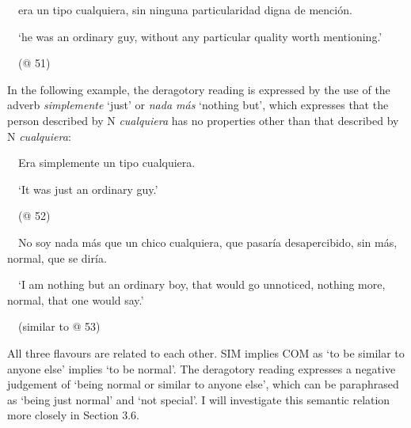 \begin{styleStandard}
\ \ era un tipo cualquiera, sin ninguna particularidad digna de mención.
\end{styleStandard}

\begin{styleStandard}
\ \ ‘he was an ordinary guy, without any particular quality worth mentioning.’
\end{styleStandard}

\begin{styleStandard}
\ \ (@ 51)
\end{styleStandard}

\begin{styleStandard}
In the following example, the deragotory reading is expressed by the use of the adverb \textit{simplemente} ‘just’ or \textit{nada más} ‘nothing but’, which expresses that the person described by N \textit{cualquiera }has no properties other than that described by N \textit{cualquiera}:
\end{styleStandard}

\begin{styleStandard}
\ \ Era simplemente un tipo cualquiera.
\end{styleStandard}

\begin{styleStandard}
\ \ ‘It was just an ordinary guy.’
\end{styleStandard}

\begin{styleStandard}
\ \ (@ 52)
\end{styleStandard}

\begin{styleStandard}
\ \ No soy nada más que un chico cualquiera, que pasaría desapercibido, sin más, normal, que se diría.
\end{styleStandard}

\begin{styleStandard}
\ \ ‘I am nothing but an ordinary boy, that would go unnoticed, nothing more, normal, that one would say.’ 
\end{styleStandard}

\begin{styleStandard}
\ \ (similar to @ 53)
\end{styleStandard}

\begin{styleStandard}
All three flavours are related to each other. SIM implies COM as ‘to be similar to anyone else’ implies ‘to be normal’. The deragotory reading expresses a negative judgement of ‘being normal or similar to anyone else’, which can be paraphrased as ‘being just normal’ and ‘not special’. I will investigate this semantic relation more closely in Section 3.6.
\end{styleStandard}

